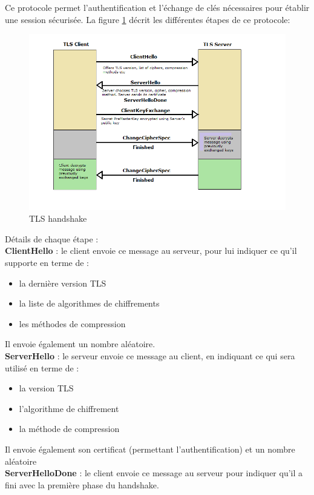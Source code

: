 Ce protocole permet l'authentification et l'échange de clés nécessaires pour établir une session sécurisée. La figure \ref{handshake} décrit les différentes étapes de ce protocole:
\begin{figure}[H]
  \centering
  \includegraphics[scale=0.6]{img/tls-handshake.png}
  \caption{TLS handshake}
  \label{handshake}
\end{figure}  

Détails de chaque étape :\\


\textbf{ClientHello} : le client envoie ce message au serveur, pour lui indiquer ce qu'il supporte en terme de  :
\begin{itemize}
\item la dernière version TLS 
\item la liste de algorithmes de chiffrements  
\item les méthodes de compression
\end{itemize}
Il envoie également un nombre aléatoire.\\


\textbf{ServerHello} : le serveur envoie ce message au client, en indiquant ce qui sera utilisé en terme de : 
\begin{itemize}
\item la version TLS
\item l'algorithme de chiffrement
\item la méthode de compression
\end{itemize}
Il envoie également son certificat (permettant l'authentification) et un nombre aléatoire\\

\textbf{ServerHelloDone} : le client envoie ce message au serveur pour indiquer qu'il a fini avec la première phase du handshake.\\

